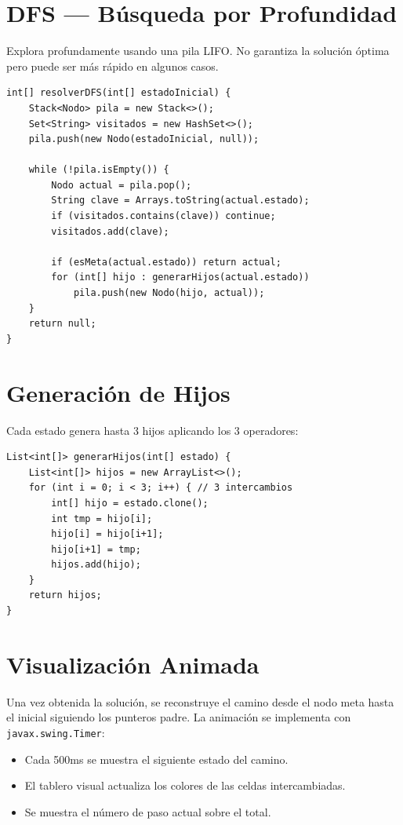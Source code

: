 \documentclass[12pt,a4paper]{article}
\begin{document}
\section{DFS --- Búsqueda por Profundidad}

Explora profundamente usando una pila LIFO. No garantiza la solución óptima pero puede ser más rápido en algunos casos.

\begin{lstlisting}
int[] resolverDFS(int[] estadoInicial) {
    Stack<Nodo> pila = new Stack<>();
    Set<String> visitados = new HashSet<>();
    pila.push(new Nodo(estadoInicial, null));

    while (!pila.isEmpty()) {
        Nodo actual = pila.pop();
        String clave = Arrays.toString(actual.estado);
        if (visitados.contains(clave)) continue;
        visitados.add(clave);

        if (esMeta(actual.estado)) return actual;
        for (int[] hijo : generarHijos(actual.estado))
            pila.push(new Nodo(hijo, actual));
    }
    return null;
}
\end{lstlisting}

\section{Generación de Hijos}

Cada estado genera hasta 3 hijos aplicando los 3 operadores:

\begin{lstlisting}
List<int[]> generarHijos(int[] estado) {
    List<int[]> hijos = new ArrayList<>();
    for (int i = 0; i < 3; i++) { // 3 intercambios
        int[] hijo = estado.clone();
        int tmp = hijo[i];
        hijo[i] = hijo[i+1];
        hijo[i+1] = tmp;
        hijos.add(hijo);
    }
    return hijos;
}
\end{lstlisting}

\section{Visualización Animada}

Una vez obtenida la solución, se reconstruye el camino desde el nodo meta hasta el inicial siguiendo los punteros padre. La animación se implementa con \texttt{javax.swing.Timer}:

\begin{itemize}
  \item Cada 500ms se muestra el siguiente estado del camino.
  \item El tablero visual actualiza los colores de las celdas intercambiadas.
  \item Se muestra el número de paso actual sobre el total.
\end{itemize}
\end{document}
